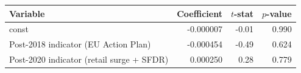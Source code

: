\begin{tabular}{lrrr}
\toprule
Variable & Coefficient & $t$-stat & $p$-value \\
\midrule
const & -0.000007 & -0.01 & 0.990 \\
Post-2018 indicator (EU Action Plan) & -0.000454 & -0.49 & 0.624 \\
Post-2020 indicator (retail surge + SFDR) & 0.000250 & 0.28 & 0.779 \\
\bottomrule
\end{tabular}